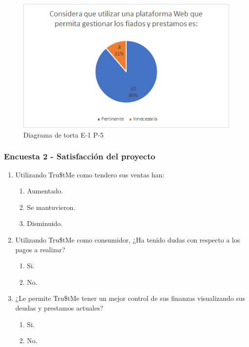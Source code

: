 {{		\begin{figure}[H]
			\centering
			\includegraphics[width=0.8\linewidth]{annexes/e1-p5.png}
			\caption{Diagrama de torta E-1 P-5}
		\end{figure}
		}
		
		\subsubsection*{Encuesta 2 - Satisfacción del proyecto}
		
			\begin{enumerate}
				
				\item Utilizando Tru\$tMe como tendero sus ventas han:
				
				\begin{enumerate}
					\item Aumentado.
					\item Se mantuvieron.
					\item Disminuido.
				\end{enumerate}
				
				\item Utilizando Tru\$tMe como consumidor, ¿Ha tenido dudas con respecto a los pagos a realizar?
				
				\begin{enumerate}
					\item Si.
					\item No.
				\end{enumerate}	
				
				\item ¿Le permite Tru\$tMe tener un mejor control de sus finanzas visualizando sus deudas y prestamos actuales?
				
				\begin{enumerate}
					\item Si.
					\item No.
				\end{enumerate}
				

\end{enumerate}}
